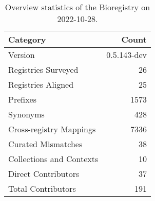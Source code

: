 \begin{table}
\centering
\caption{Overview statistics of the Bioregistry on 2022-10-28.}
\label{tab:bioregistry-summary}
\begin{tabular}{lr}
\toprule
                Category &       Count \\
\midrule
                 Version & 0.5.143-dev \\
     Registries Surveyed &          26 \\
      Registries Aligned &          25 \\
                Prefixes &        1573 \\
                Synonyms &         428 \\
 Cross-registry Mappings &        7336 \\
      Curated Mismatches &          38 \\
Collections and Contexts &          10 \\
     Direct Contributors &          37 \\
      Total Contributors &         191 \\
\bottomrule
\end{tabular}
\end{table}
